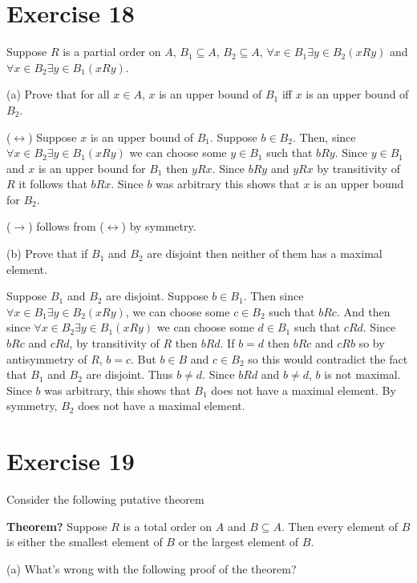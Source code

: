 \documentclass[11pt]{article}
\begin{document}
\section*{Exercise 18}

Suppose $R$ is a partial order on $A$, $B_1 \subseteq A$, $B_2 \subseteq A$,
$\forall x \in B_1 \exists y \in B_2 (xRy)$ and $\forall x \in B_2 \exists y \in B_1 (xRy)$.

\noindent (a) Prove that for all $x \in A$, $x$ is an upper bound of $B_1$ iff 
$x$ is an upper bound of $B_2$.

($\leftrightarrow$) Suppose $x$ is an upper bound of $B_1$. Suppose $b \in B_2$.
Then, since $\forall x \in B_2 \exists y \in B_1 (xRy)$ we can choose some 
$y \in B_1$ such that $bRy$. Since $y \in B_1$ and $x$ is an upper bound for $B_1$
then $yRx$. Since $bRy$ and $yRx$ by transitivity of $R$ it follows that $bRx$. 
Since $b$ was arbitrary this shows that $x$ is an upper bound for $B_2$.

($\rightarrow$) follows from ($\leftrightarrow$) by symmetry.

\noindent (b) Prove that if $B_1$ and $B_2$ are disjoint then neither of them 
has a maximal element. 

Suppose $B_1$ and $B_2$ are disjoint. Suppose $b \in B_1$. Then since 
$\forall x \in B_1 \exists y \in B_2 (xRy)$, we can choose some $c \in B_2$ such 
that $bRc$. And then since $\forall x \in B_2 \exists y \in B_1 (xRy)$ we can 
choose some $d \in B_1$ such that $cRd$. Since $bRc$ and $cRd$, by
transitivity of $R$ then $bRd$. If $b=d$ then $bRc$ and $cRb$ so by antisymmetry
of $R$, $b=c$. But $b \in B$ and $c \in B_2$ so this would contradict the fact 
that $B_1$ and $B_2$ are disjoint. Thus $b \neq d$. Since $bRd$ and $b \neq d$,
$b$ is not maximal. Since $b$ was arbitrary, this shows that $B_1$ does not have
a maximal element. By symmetry, $B_2$ does not have a maximal element.

\section*{Exercise 19}

Consider the following putative theorem 

\textbf{Theorem?} Suppose $R$ is a total order on $A$ and $B \subseteq A$. Then 
every element of $B$ is either the smallest element of $B$ or the largest element 
of $B$. 

\noindent (a) What's wrong with the following proof of the theorem?
\end{document}
